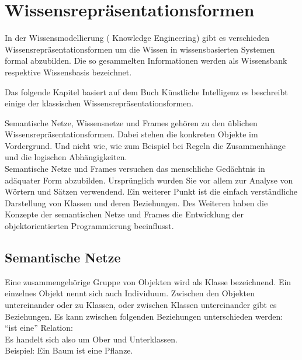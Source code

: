 \chapter{Wissensrepräsentationsformen}
\label{chap:wissensrepFormen}


In der Wissensmodellierung ( Knowledge Engineering) gibt es verschieden Wissensrepräsentationsformen um die Wissen in wissensbasierten Systemen formal abzubilden. Die so gesammelten Informationen werden als Wissensbank respektive Wissensbasis bezeichnet.~\cite{wikiWissensrep}

Das folgende Kapitel basiert auf dem Buch Künstliche Intelligenz\cite{laemmel} es beschreibt einige der klassischen Wissensrepräsentationsformen.

Semantische Netze, Wissensnetze und Frames gehören zu den üblichen Wissensrepräsentationsformen. Dabei stehen die konkreten Objekte im Vordergrund. Und nicht wie, wie zum Beispiel bei Regeln die Zusammenhänge und die logischen Abhängigkeiten.\\

Semantische Netze und Frames versuchen das menschliche Gedächtnis in adäquater Form abzubilden. Ursprünglich wurden Sie vor allem zur Analyse von Wörtern und Sätzen verwendend. Ein weiterer Punkt ist die einfach verständliche Darstellung von Klassen und deren Beziehungen. Des Weiteren haben die Konzepte der semantischen Netze und Frames die Entwicklung der objektorientierten Programmierung beeinflusst.

\section{Semantische Netze}
\label{sec:wissensrepFormen_semantischeNetze}

Eine zusammengehörige Gruppe von Objekten wird als Klasse bezeichnend. Ein einzelnes Objekt nennt sich auch Individuum. Zwischen den Objekten untereinander oder zu Klassen, oder zwischen Klassen untereinander gibt es Beziehungen. Es kann zwischen folgenden Beziehungen unterschieden werden:\\

"`ist eine"' Relation: \\
\noindent\hspace*{15mm} Es handelt sich also um Ober und Unterklassen.\\ 
\noindent\hspace*{15mm} Beispiel: Ein Baum ist eine Pflanze.\\


